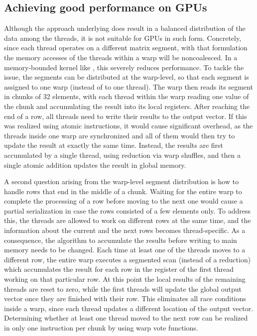 \subsection{Achieving good performance on GPUs}

Although the approach underlying \bcsr does result
in a balanced distribution of the data among the threads,
it is not suitable for GPUs in such form.
Concretely, since each thread operates on a different matrix segment,
with that formulation the memory accesses of the threads within a warp
will be noncoalesced.
In a memory-bounded kernel like \spmv, this severely reduces performance.
To tackle the issue, the segments can be distributed at the warp-level,
so that each segment is assigned to one warp (instead of to one thread).
The warp then reads its segment in chunks of 32 elements,
with each thread within the warp reading one value of the chunk
and accumulating the result into its local registers.
After reaching the end of a row,
all threads need to write their results to the output vector.
If this was realized using atomic instructions,
it would cause significant overhead,
as the threads inside one warp are synchronized
and all of them would then try to update the result at exactly the same time.
Instead, the results are first accumulated
by a single thread, using reduction via warp shuffles,
and then a single atomic addition updates the result in global memory.

A second question arising from the warp-level segment distribution is
how to handle rows that end in the middle of a chunk.
Waiting for the entire warp to complete the processing of a row
before moving to the next one
would cause a partial serialization
in case the rows consisted of a few elements only.
To address this, the threads are allowed to work
on different rows at the same time,
and the information about the current and the next rows
becomes thread-specific.
As a consequence, the algorithm to accumulate the results
before writing to main memory needs to be changed.
Each time at least one of the threads moves to a different row,
the entire warp executes a segmented scan (instead of a reduction)
which accumulates the result for each row
in the register of the first thread working on that particular row.
At this point the local results of the remaining threads are reset to zero,
while the first threads will update the global output vector
once they are finished with their row.
This eliminates all race conditions inside a warp,
since each thread updates a different location of the output vector.
Determining whether at least one thread moved to the next row can be
realized in only one instruction per chunk by using warp vote functions.

